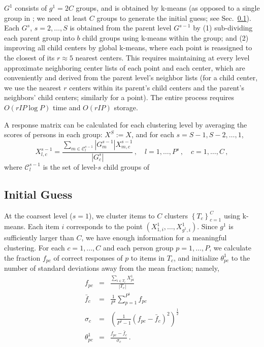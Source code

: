 \documentclass{article}
\newcommand{\cC}{\mathcal{C}}
\newcommand{\ta}{\theta}
\begin{document}
$G^1$ consists of $g^1 = 2C$ groups, and is obtained by k-means (as opposed to a single group in \cite{miniclustering}; we need at least $C$ groups to generate the initial guess; see Sec.~\ref{initial_guess}). Each $G^s$, $s=2,\dots,S$ is obtained from the parent level $G^{s-1}$ by (1) sub-dividing each parent group into $b$ child groups using k-means within the group; and (2) improving all child centers by global k-means, where each point is reassigned to the closest of its $r \approx 5$ nearest centers. This requires maintaining at every level approximate neighboring center lists of each point and each center, which are conveniently and derived from the parent level's neighbor lists (for a child center, we use the nearest $r$ centers within its parent's child centers and the parent's neighbors' child centers; similarly for a point). The entire process requires $O(r I P \log P)$ time and $O(r I P)$ storage.

A response matrix can be calculated for each clustering level by averaging the scores of persons in each group: $X^S := X$, and for each $s = S-1,S-2,\dots,1$,
\begin{equation}
	X^{s-1}_{l,c} = \frac{\sum_{m \in \cC^{s-1}_l} |G^{s-1}_m| X^{s-1}_{m,c}}{|G^s_c|}\,,
	\quad l=1,\dots,P^s\,,\quad c = 1,\dots,C\,,
	\label{x_averaging}
\end{equation}
where $\cC^{s-1}_l$ is the set of level-$s$ child groups of 

\subsection{Initial Guess}
\label{initial_guess}
At the coarsest level ($s=1$), we cluster items to $C$ clusters $\left\{T_c\right\}_{c=1}^C$ using k-means. Each item $i$ corresponds to the point $(X^1_{1,i},\dots,X^1_{g^1,i})$. Since $g^1$ is sufficiently larger than $C$, we have enough information for a meaningful clustering. For each $c=1,\dots,C$ and each person group $p=1,\dots,P$, we calculate the fraction $f_{pc}$ of correct responses of $p$ to items in $T_c$, and initialize $\ta^1_{pc}$ to the number of standard deviations away from the mean fraction; namely,
\begin{eqnarray}
	f_{pc} &=& \frac{\sum_{i \in T_c} X^1_{pi}}{|T_c|} \\
	\bar{f}_c &=& \frac{1}{P^1} \sum_{p=1}^{P^1} f_{pc} \\
	\sigma_c &=& \left(\frac{1}{P^1-1} (f_{pc} - \bar{f}_c)^2 \right)^{\frac12} \\
	\ta^1_{pc} &=& \frac{f_{pc} - \bar{f}_c}{\sigma_c}\,.
	\label{coarsest_init}
\end{eqnarray}
\end{document}
